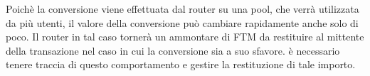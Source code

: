 Poichè la conversione viene effettuata dal router su una pool, che verrà utilizzata da più utenti, il valore della conversione può cambiare rapidamente anche solo di poco. Il router in tal caso tornerà un ammontare di FTM da restituire al mittente della transazione nel caso in cui la conversione sia a suo sfavore. è necessario tenere traccia di questo comportamento e gestire la restituzione di tale importo.


